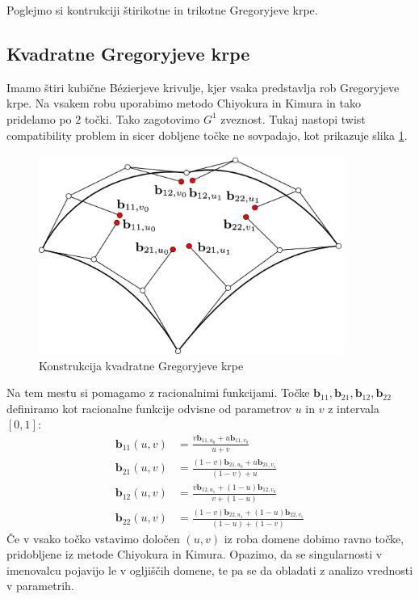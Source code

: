 \documentclass[a4paper,regno]{article}
\newcommand{\tbf}{\textbf}
\begin{document}
Poglejmo si kontrukciji štirikotne in trikotne Gregoryjeve krpe.


\subsection{Kvadratne Gregoryjeve krpe}
Imamo štiri kubične Bézierjeve krivulje, kjer vsaka predstavlja rob Gregoryjeve krpe. Na vsakem robu uporabimo metodo Chiyokura in Kimura in tako pridelamo po $2$ točki. Tako zagotovimo $G^1$ zveznost. Tukaj nastopi twist compatibility problem in sicer dobljene točke ne sovpadajo, kot prikazuje slika \ref{fig:kvadratna}.

\begin{figure}[h]
	\centering
	\includegraphics[width=10cm]{gregory_krpe_kvadratna.jpg}
	\caption{Konstrukcija kvadratne Gregoryjeve krpe}
	\label{fig:kvadratna}
\end{figure}

Na tem mestu si pomagamo z racionalnimi funkcijami. Točke $\tbf{b}_{11}, \tbf{b}_{21}, \tbf{b}_{12}, \tbf{b}_{22}$ definiramo kot racionalne funkcije odvisne od parametrov $u$ in $v$ z intervala $[0,1]$:
\begin{align*}
\tbf{b}_{11}(u,v) &=  \frac{v \textbf{b}_{11,u_0}+u\tbf{b}_{11,v_0}}{u +v} \\
\tbf{b}_{21}(u,v) &= \frac{(1-v) \tbf{b}_{21,u_0}+u\tbf{b}_{21,v_1}}{(1-v)+u} \\
\tbf{b}_{12}(u,v) &= \frac{v \tbf{b}_{12,u_1}+(1-u)\tbf{b}_{12,v_0}}{v+(1-u)} \\
\tbf{b}_{22}(u,v) &= \frac{(1-v) \tbf{b}_{22,u_1}+(1-u)\tbf{b}_{22,v_1}}{(1-u)+(1-v)} 
\end{align*}
Če v vsako točko vstavimo določen $(u,v)$ iz roba domene dobimo ravno točke, pridobljene iz metode Chiyokura in Kimura. Opazimo, da se singularnosti v imenovalcu pojavijo le v ogljiščih domene, te pa se da obladati z analizo vrednosti v parametrih.
	
\end{document}
